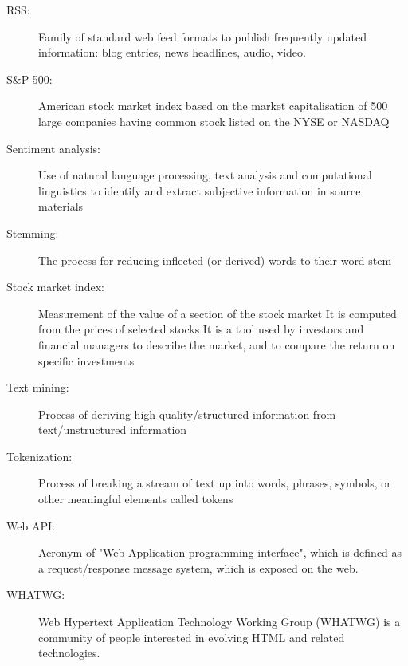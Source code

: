 \begin{description}
  \item[RSS:] Family of standard web feed formats to publish frequently updated information: blog entries, news headlines, audio, video.
  \item[S&P 500:] American stock market index based on the market capitalisation of 500 large companies having common stock listed on the NYSE or NASDAQ
  \item[Sentiment analysis:] Use of natural language processing, text analysis and computational linguistics to identify and extract subjective information in source materials
  \item[Stemming:] The process for reducing inflected (or derived) words to their word stem
  \item[Stock market index:] Measurement of the value of a section of the stock market It is computed from the prices of selected stocks It is a tool used by investors and financial managers to describe the market, and to compare the return on specific investments
  \item[Text mining:] Process of deriving high-quality/structured information from text/unstructured information
  \item[Tokenization:] Process of breaking a stream of text up into words, phrases, symbols, or other meaningful elements called tokens
  \item[Web API:] Acronym of "Web Application programming interface", which is defined as a request/response message system, which is exposed on the web.
  \item[WHATWG:] Web Hypertext Application Technology Working Group (WHATWG) is a community of people interested in evolving HTML and related technologies.
\end{description}